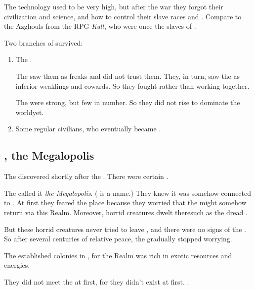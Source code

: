 The technology used to be very high, but after the war they forgot their civilization and science, and how to control their slave races and \daemons. 
Compare to the Azghouls from the RPG \emph{Kult}, who were once the slaves of \humans. 

Two branches of \ophidians{} survived: 

\begin{enumerate}
  \item 
    The \dragons.
    
    The \quiljaaran{} saw them as freaks and did not trust them. 
    They, in turn, saw the \quiljaaran{} as inferior weaklings and cowards. 
    So they fought rather than working together. 
    
    The \dragons{} were strong, but few in number. 
    So they did not rise to dominate the world\prikker yet. 
  \item 
    Some regular \ophidian{} civilians, who eventually became \quiljaaran. 
\end{enumerate}









\subsection{\Nyx, the Megalopolis}
The \ophidians discovered  shortly after the \firstbanewar.
There were certain .

The \ophidians called it \emph{the Megalopolis}. 
(\quo{\Nyx} is a \resphan name.)
They knew it was somehow connected to \Erebos.
At first they feared the place because they worried that the \banes might somehow return via this Realm. 
Moreover, horrid creatures dwelt there\dash such as the dread \umbrae.

But these horrid creatures never tried to leave \Nyx, and there were no signs of the \banes. 
So after several centuries of relative peace, the \ophidians gradually stopped worrying. 

The \ophidians established colonies in \Nyx, for the Realm was rich in exotic resources and energies. 

They did not meet the \resphain at first, for they didn't exist at first. 
. 










